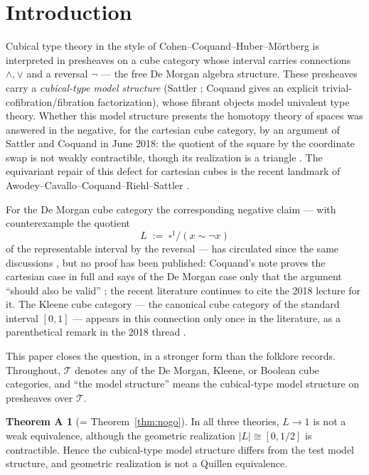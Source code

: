 \documentclass[11pt]{amsart}
\theoremstyle{definition}
\newtheorem*{thmA}{Theorem A}
\newcommand{\Ldash}{L}
\begin{document}
\maketitle

\section{Introduction}
\label{sec:intro}

Cubical type theory in the style of
Cohen--Coquand--Huber--M\"ortberg \cite{CCHM} is interpreted in
presheaves on a cube category whose interval carries connections
$\wedge, \vee$ and a reversal $\neg$ --- the free De Morgan algebra
structure.  These presheaves carry a \emph{cubical-type model
structure} (Sattler \cite{SattlerEEP}; Coquand \cite{CoqNote} gives
an explicit trivial-cofibration/fibration factorization), whose
fibrant objects model univalent type theory.  Whether this model
structure presents the homotopy theory of spaces was answered in
the negative, for the cartesian cube category, by an argument of
Sattler and Coquand in June 2018: the quotient of the square by the
coordinate swap is not weakly contractible, though its realization
is a triangle \cite{CoqNote, CoqML}.  The equivariant repair of
this defect for cartesian cubes is the recent landmark of
Awodey--Cavallo--Coquand--Riehl--Sattler \cite{ACCRS}.

For the De Morgan cube category the corresponding negative claim
--- with counterexample the quotient
\[
  \Ldash \;:=\; \square^1 / (x \sim \neg x)
\]
of the representable interval by the reversal --- has circulated
since the same discussions \cite{CoqML, SatTalk}, but no proof has
been published: Coquand's note proves the cartesian case in full
and says of the De Morgan case only that the argument ``should also
be valid'' \cite[Rem.~3]{CoqNote}; the recent literature
\cite{ACCRS, CavalloSattlerRev} continues to cite the 2018 lecture
\cite{SatTalk} for it.  The Kleene cube category --- the canonical
cube category of the standard interval $[0,1]$
\cite{BuchholtzMorehouse} --- appears in this connection only once
in the literature, as a parenthetical remark in the 2018 thread
\cite{CoqML}.

This paper closes the question, in a stronger form than the
folklore records.  Throughout, $\mathcal{T}$ denotes any of the De
Morgan, Kleene, or Boolean cube categories, and ``the model
structure'' means the cubical-type model structure on presheaves
over $\mathcal{T}$.

\begin{thmA}[= Theorem~\ref{thm:nogo}]
  In all three theories, $\Ldash \to 1$ is not a weak equivalence,
  although the geometric realization $|\Ldash| \cong [0, 1/2]$ is
  contractible.  Hence the cubical-type model structure differs
  from the test model structure, and geometric realization is not a
  Quillen equivalence.
\end{thmA}
\end{document}
